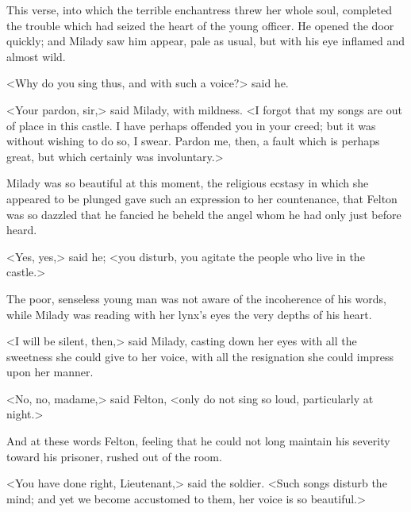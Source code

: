 This verse, into which the terrible enchantress threw her whole soul, completed the trouble which had seized the heart of the young officer. He opened the door quickly; and Milady saw him appear, pale as usual, but with his eye inflamed and almost wild. 

<Why do you sing thus, and with such a voice?> said he. 

<Your pardon, sir,> said Milady, with mildness. <I forgot that my songs are out of place in this castle. I have perhaps offended you in your creed; but it was without wishing to do so, I swear. Pardon me, then, a fault which is perhaps great, but which certainly was involuntary.> 

Milady was so beautiful at this moment, the religious ecstasy in which she appeared to be plunged gave such an expression to her countenance, that Felton was so dazzled that he fancied he beheld the angel whom he had only just before heard. 

<Yes, yes,> said he; <you disturb, you agitate the people who live in the castle.> 

The poor, senseless young man was not aware of the incoherence of his words, while Milady was reading with her lynx's eyes the very depths of his heart. 

<I will be silent, then,> said Milady, casting down her eyes with all the sweetness she could give to her voice, with all the resignation she could impress upon her manner. 

<No, no, madame,> said Felton, <only do not sing so loud, particularly at night.> 

And at these words Felton, feeling that he could not long maintain his severity toward his prisoner, rushed out of the room. 

<You have done right, Lieutenant,> said the soldier. <Such songs disturb the mind; and yet we become accustomed to them, her voice is so beautiful.>